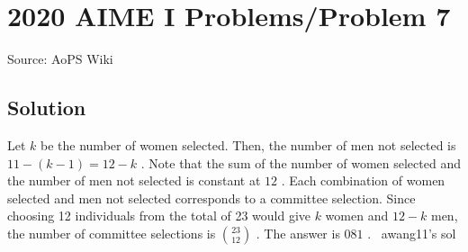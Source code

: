 \documentclass[12pt]{article}
\begin{document}
\section*{{2020 AIME I Problems/Problem 7}}
Source: AoPS Wiki

\subsection*{Solution}
Let $k$ be the number of women selected. Then, the number of men not selected is $11-(k-1)=12-k$ .
Note that the sum of the number of women selected and the number of men not selected is constant at $12$ . Each combination of women selected and men not selected corresponds to a committee selection. Since choosing 12 individuals from the total of 23 would give $k$ women and $12-k$ men, the number of committee selections is $\binom{23}{12}$ .
The answer is $\boxed{081}$ .
~awang11's sol
\end{document}
